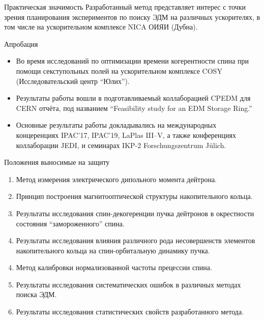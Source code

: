 \documentclass[14pt]{beamer}
\begin{document}
\begin{frame}{Практическая значимость}
	Разработанный метод представляет интерес с точки зрения планирования экспериментов по поиску ЭДМ
	на различных ускорителях, в том числе на ускорительном комплексе NICA ОИЯИ (Дубна).
\end{frame}

\begin{frame}{Апробация}
	\begin{itemize}
		\item Во время исследований по оптимизации времени когерентности спина при помощи секступольных полей на ускорительном комплексе COSY (Исследовательский центр ``Юлих'').
		\item Результаты работы вошли в подготавливаемый коллаборацией CPEDM для CERN отчёта, под названием ``Feasibility study for an EDM Storage Ring.''
		\item Основные результаты работы докладывались на международных концеренциях IPAC'17, IPAC'19, LaPlas III--V, а также конференциях коллаборации JEDI, и семинарах IKP-2 Forschungszentrum J\"ulich.
	\end{itemize}
\end{frame}

\begin{frame}{Положения выносимые на защиту}
	\begin{enumerate}
		\item Метод измерения электрического дипольного момента дейтрона.
		\item Принцип построения магнитооптической структуры накопительного кольца.
		\item Результаты исследования спин-декогеренции пучка дейтронов в окрестности состояния ``замороженного'' спина.
		\item Результаты исследования влияния различного рода несовершенств элементов накопительного кольца 
		на спин-орбитальную динамику пучка. 
	\end{enumerate}
\end{frame}
\begin{frame}
	\begin{enumerate}\setcounter{enumi}{3}
		\item Метод калибровки нормализованной частоты прецессии спина.
		\item Результаты исследования систематических ошибок в различных методах поиска ЭДМ. 
		\item Результаты исследования статистических свойств разработанного метода.
	\end{enumerate}
\end{frame}
\end{document}
